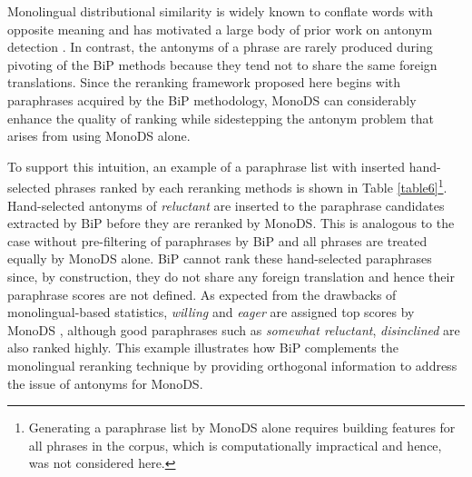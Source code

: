 \documentclass[11pt]{article}
\begin{document}
Monolingual distributional similarity is widely known to conflate words with
opposite meaning and has motivated a large body of prior work on antonym
detection
\cite{Lin03identifyingsynonyms,Lin01discoveryof,MohammadEtAl08,Mohammad_multiplealternative08,MarneffeFindingcontradictions08,Voorhees08}.
In contrast, the antonyms of a phrase are rarely produced during pivoting of the BiP methods because they tend not to share the same foreign translations.
Since the reranking framework proposed here begins with paraphrases acquired by the BiP methodology,
MonoDS can considerably enhance the quality of ranking while sidestepping the antonym problem that arises from using MonoDS alone.

To support this intuition, an example of a paraphrase list with inserted hand-selected phrases ranked by each reranking methods is shown in Table \ref{table6}\footnote{Generating a paraphrase list by MonoDS alone requires building features for all phrases in the corpus, which is computationally impractical and hence, was not considered here.}. Hand-selected antonyms of \emph{reluctant} are inserted to the paraphrase candidates extracted by BiP before they are reranked by MonoDS. This is analogous to the case without pre-filtering of paraphrases by BiP and all phrases are treated equally by MonoDS alone. BiP cannot rank these hand-selected paraphrases since, by construction, they do not share any foreign translation and hence their paraphrase scores are not defined. As expected from the drawbacks of monolingual-based statistics, \emph{willing} and \emph{eager} are assigned top scores by MonoDS%
, although good paraphrases such as \emph{somewhat reluctant}, \emph{disinclined} are also ranked highly. This example illustrates how BiP complements the monolingual reranking technique by providing orthogonal information to address the issue of antonyms for MonoDS.

\end{document}
